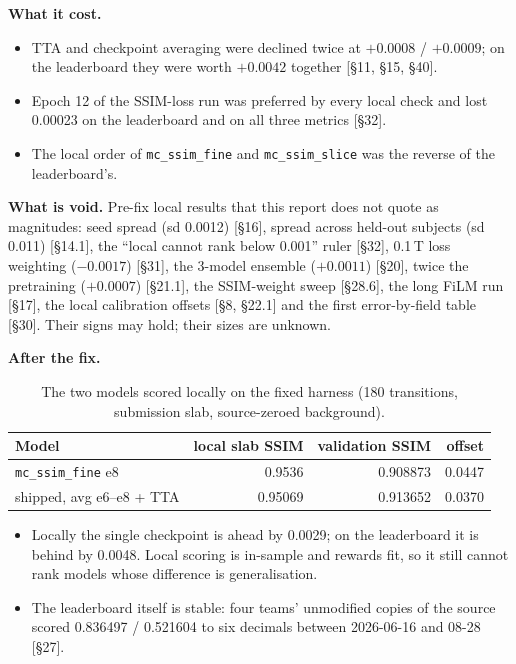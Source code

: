 \documentclass[10pt,a4paper]{article}
\begin{document}
\textbf{What it cost.}
\begin{itemize}
  \item TTA and checkpoint averaging were declined twice at $+0.0008$ / $+0.0009$; on the
        leaderboard they were worth $+0.0042$ together [\S11, \S15, \S40].
  \item Epoch 12 of the SSIM-loss run was preferred by every local check and lost 0.00023 on the
        leaderboard and on all three metrics [\S32].
  \item The local order of \texttt{mc\_ssim\_fine} and \texttt{mc\_ssim\_slice} was the reverse
        of the leaderboard's.
\end{itemize}

\textbf{What is void.} Pre-fix local results that this report does not quote as magnitudes:
seed spread (sd 0.0012) [\S16], spread across held-out subjects (sd 0.011) [\S14.1], the
``local cannot rank below 0.001'' ruler [\S32], 0.1\,T loss weighting ($-0.0017$) [\S31], the
3-model ensemble ($+0.0011$) [\S20], twice the pretraining ($+0.0007$) [\S21.1], the SSIM-weight
sweep [\S28.6], the long FiLM run [\S17], the local calibration offsets [\S8, \S22.1] and the
first error-by-field table [\S30]. Their signs may hold; their sizes are unknown.

\textbf{After the fix.}
\begin{table}[H]
\centering\small
\begin{tabular}{lrrr}
\toprule
Model & local slab SSIM & validation SSIM & offset \\
\midrule
\texttt{mc\_ssim\_fine} e8                       & 0.9536  & 0.908873 & 0.0447 \\
shipped, avg e6--e8 + TTA                         & 0.95069 & 0.913652 & 0.0370 \\
\bottomrule
\end{tabular}
\caption{The two models scored locally on the fixed harness (180 transitions, submission slab,
source-zeroed background).}
\label{tab:calib}
\end{table}
\begin{itemize}
  \item Locally the single checkpoint is ahead by 0.0029; on the leaderboard it is behind by
        0.0048. Local scoring is in-sample and rewards fit, so it still cannot rank models whose
        difference is generalisation.
  \item The leaderboard itself is stable: four teams' unmodified copies of the source scored
        0.836497 / 0.521604 to six decimals between 2026-06-16 and 08-28 [\S27].
\end{itemize}
\end{document}
